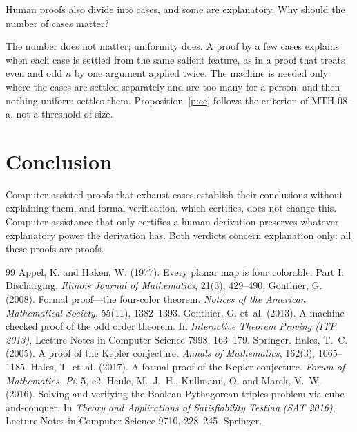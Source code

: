 \documentclass{situationist-preprint}
\begin{document}
\begin{objection}
Human proofs also divide into cases, and some are explanatory. Why should the number of cases matter?
\end{objection}

\begin{reply}
The number does not matter; uniformity does. A proof by a few cases explains when each case is settled from the same salient feature, as in a proof that treats even and odd $n$ by one argument applied twice. The machine is needed only where the cases are settled separately and are too many for a person, and then nothing uniform settles them. Proposition~\ref{p:ce} follows the criterion of MTH-08-a, not a threshold of size.
\end{reply}

\section{Conclusion}

Computer-assisted proofs that exhaust cases establish their conclusions without explaining them, and formal verification, which certifies, does not change this. Computer assistance that only certifies a human derivation preserves whatever explanatory power the derivation has. Both verdicts concern explanation only: all these proofs are proofs.

\begin{thebibliography}{99}\small
{} Appel, K. and Haken, W. (1977). Every planar map is four colorable. Part I: Discharging. \emph{Illinois Journal of Mathematics}, 21(3), 429--490.
 Gonthier, G. (2008). Formal proof---the four-color theorem. \emph{Notices of the American Mathematical Society}, 55(11), 1382--1393.
 Gonthier, G. et~al. (2013). A machine-checked proof of the odd order theorem. In \emph{Interactive Theorem Proving (ITP 2013)}, Lecture Notes in Computer Science 7998, 163--179. Springer.
 Hales, T.~C. (2005). A proof of the Kepler conjecture. \emph{Annals of Mathematics}, 162(3), 1065--1185.
 Hales, T. et~al. (2017). A formal proof of the Kepler conjecture. \emph{Forum of Mathematics, Pi}, 5, e2.
 Heule, M.~J.~H., Kullmann, O. and Marek, V.~W. (2016). Solving and verifying the Boolean Pythagorean triples problem via cube-and-conquer. In \emph{Theory and Applications of Satisfiability Testing (SAT 2016)}, Lecture Notes in Computer Science 9710, 228--245. Springer.
\end{thebibliography}
\end{document}
